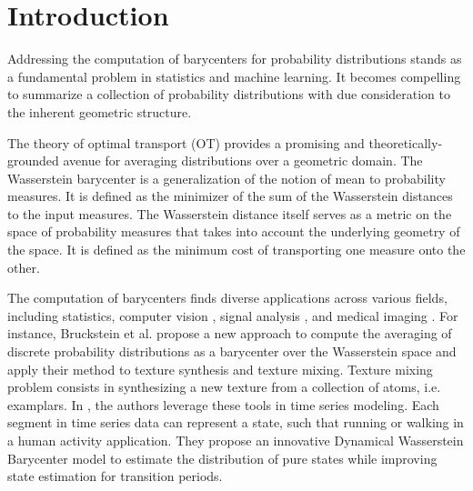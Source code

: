 \section{Introduction}


Addressing the computation of barycenters for probability distributions  stands as a fundamental problem in statistics and machine learning. It becomes compelling to summarize a collection of probability distributions with due consideration to the inherent geometric structure. 

The theory of optimal transport (OT) provides a promising and theoretically-grounded avenue for averaging distributions over a geometric domain. The Wasserstein barycenter is a generalization of the notion of mean to probability measures. It is defined as the minimizer of the sum of the Wasserstein distances to the input measures. The Wasserstein distance itself serves as a metric on the space of probability measures that takes into account the underlying geometry of the space. It is defined as the minimum cost of transporting one measure onto the other. 

The computation of barycenters finds diverse applications across various fields, including statistics, computer vision \cite{bruckstein_wasserstein_2012, korotin_wasserstein_nodate}, signal analysis \cite{cheng_dynamical_2021,cheng_nonparametric_2023}, and medical imaging \cite{dvurechenskii_decentralize_2018}. 
For instance, Bruckstein et al. \cite{bruckstein_wasserstein_2012} propose a new approach to compute the averaging of discrete probability distributions as a barycenter over the Wasserstein space and apply their method to texture synthesis and texture mixing. Texture mixing problem consists in synthesizing a new texture from a collection of atoms, i.e. examplars. In \cite{cheng_dynamical_2021}, the authors leverage these tools in time series modeling. Each segment in time series data can represent a state, such that running or walking in a human activity application. They propose an innovative Dynamical Wasserstein Barycenter model to estimate the distribution of pure states while improving state estimation for transition periods. \\

